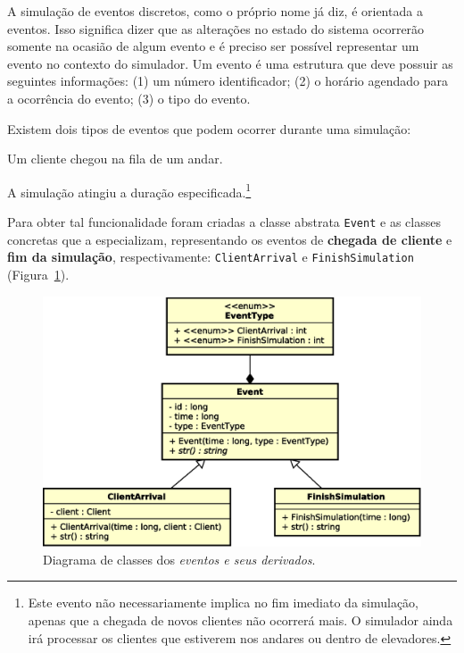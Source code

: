 A simulação de eventos discretos, como o próprio nome já diz, é orientada a
eventos. Isso significa dizer que as alterações no estado do sistema ocorrerão
somente na ocasião de algum evento e é preciso ser possível representar um
evento no contexto do simulador. Um evento é uma estrutura que deve possuir as
seguintes informações: (1) um número identificador; (2) o horário agendado para
a ocorrência do evento; (3) o tipo do evento.

Existem dois tipos de eventos que podem ocorrer durante uma simulação:

\begin{description}\setlength\itemsep{0mm}
  \item[Chegada de cliente] Um cliente chegou na fila de um andar.

  \item[Fim da simulação] A simulação atingiu a duração
especificada.\footnote{Este evento não necessariamente implica no fim imediato
da simulação, apenas que a chegada de novos clientes não ocorrerá mais. O
simulador ainda irá processar os clientes que estiverem nos andares ou dentro de
elevadores.}

\end{description}

Para obter tal funcionalidade foram criadas a classe abstrata \texttt{Event} e
as classes concretas que a especializam, representando os eventos de
\textbf{chegada de cliente} e \textbf{fim da simulação}, respectivamente:
\texttt{ClientArrival} e \texttt{FinishSimulation}
(Figura~\ref{fig:diagram:events}).

\begin{figure}[htb!]
  \centering
  \includegraphics[scale=0.6]{img/Events}
  \caption{Diagrama de classes dos \textit{eventos e seus derivados}.}
\label{fig:diagram:events}
\end{figure}

